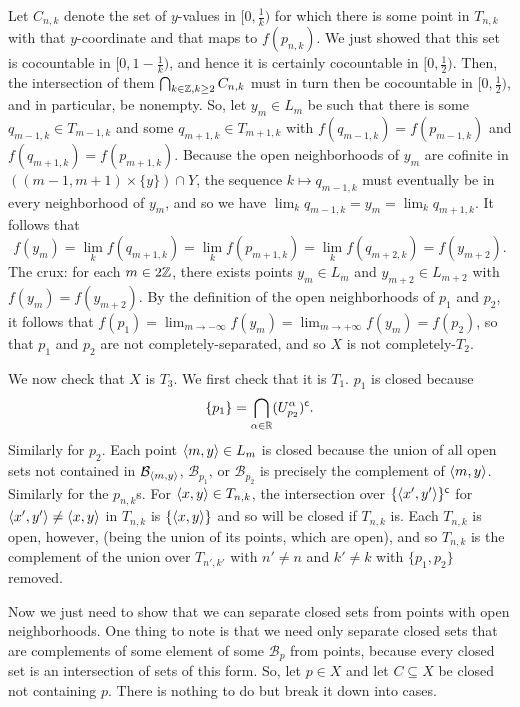 \begin{exm}
Let $C_{n,k}$ denote the set of $y$-values in $[0,\tfrac{1}{k})$ for which there is some point in $T_{n,k}$ with that $y$-coordinate and that maps to $f(p_{n,k})$.  We just showed that this set is cocountable in $[0,1-\frac{1}{k})$, and hence it is certainly cocountable in $[0,\frac{1}{2})$.  Then, the intersection of them $\bigcap _{k\in \mathbb{Z} ,k\geq 2}C_{n,k}$ must in turn then be cocountable in $[0,\frac{1}{2})$, and in particular, be nonempty.  So, let $y_m\in L_m$ be such that there is some $q_{m-1,k}\in T_{m-1,k}$ and some $q_{m+1,k}\in T_{m+1,k}$ with $f(q_{m-1,k})=f(p_{m-1,k})$ and $f(q_{m+1,k})=f(p_{m+1,k})$.  Because the open neighborhoods of $y_m$ are cofinite in $((m-1,m+1)\times \{ y\} )\cap Y$, the sequence $k\mapsto q_{m-1,k}$ must eventually be in every neighborhood of $y_m$, and so we have $\lim _kq_{m-1,k}=y_m=\lim _kq_{m+1,k}$.  It follows that
\begin{equation}
f(y_m)=\lim _kf(q_{m+1,k})=\lim _kf(p_{m+1,k})=\lim _kf(q_{m+2,k})=f(y_{m+2}).
\end{equation}
The crux:  for each $m\in 2\mathbb{Z}$, there exists points $y_m\in L_m$ and $y_{m+2}\in L_{m+2}$ with $f(y_m)=f(y_{m+2})$.  By the definition of the open neighborhoods of $p_1$ and $p_2$, it follows that $f(p_1)=\lim _{m\to -\infty}f(y_m)=\lim _{m\to +\infty}f(y_m)=f(p_2)$, so that $p_1$ and $p_2$ are not completely-separated, and so $X$ is not completely-$T_2$.

We now check that $X$ is $T_3$.  We first check that it is $T_1$.  $p_1$ is closed because
\begin{equation}
\{ p_1\} =\bigcap _{\alpha \in \mathbb{R}}(U_{p_2}^\alpha )^{\mathsf{c}}.
\end{equation}
Similarly for $p_2$.  Each point $\langle m,y\rangle\in L_m$ is closed because the union of all open sets not contained in $\mathcal{B}_{\langle m,y\rangle}$, $\mathcal{B}_{p_1}$, or $\mathcal{B}_{p_2}$ is precisely the complement of $\langle m,y\rangle$.  Similarly for the $p_{n,k}$s.  For $\langle x,y\rangle\in T_{n,k}$, the intersection over $\{ \langle x',y'\rangle\} ^{\mathsf{c}}$ for $\langle x',y'\rangle\neq \langle x,y\rangle$ in $T_{n,k}$ is $\{ \langle x,y\rangle\}$ and so will be closed if $T_{n,k}$ is.  Each $T_{n,k}$ is open, however, (being the union of its points, which are open), and so $T_{n,k}$ is the complement of the union over $T_{n',k'}$ with $n'\neq n$ and $k'\neq k$ with $\{ p_1,p_2\}$ removed.

Now we just need to show that we can separate closed sets from points with open neighborhoods.  One thing to note is that we need only separate closed sets that are complements of some element of some $\mathcal{B}_p$ from points, because every closed set is an intersection of sets of this form.  So, let $p\in X$ and let $C\subseteq X$ be closed not containing $p$.  There is nothing to do but break it down into cases.


\end{exm}
